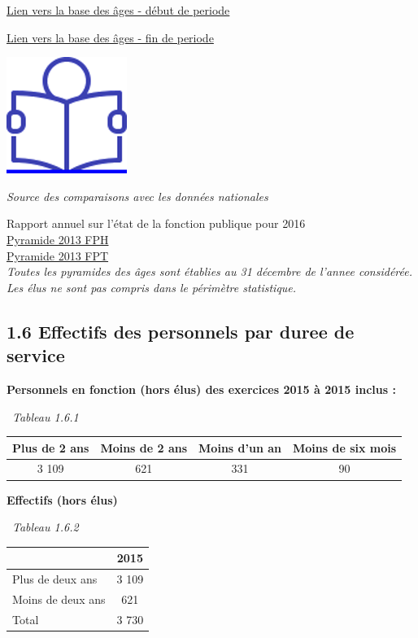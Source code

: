 \href{../Bases/Effectifs/Pyramide-des-ages-des-autres-personnels_2015.csv}{Lien
vers la base des âges - début de periode}

\href{../Bases/Effectifs/Pyramide-des-ages-des-autres-personnels_2015.csv}{Lien
vers la base des âges - fin de periode}

\href{../Docs/Notices/fiche_1.odt}{\includegraphics{icones/Notice.png}}

\emph{Source des comparaisons avec les données nationales}

Rapport annuel sur l'état de la fonction publique pour 2016\\
\href{../Docs/insee_pyramide_fph_2013.csv}{Pyramide 2013 FPH}\\
\href{../Docs/insee_pyramide_fpt_2013.csv}{Pyramide 2013 FPT}\\
\emph{Toutes les pyramides des âges sont établies au 31 décembre de
l'annee considérée.}\\
\emph{Les élus ne sont pas compris dans le périmètre statistique.}

\hypertarget{effectifs-des-personnels-par-duree-de-service}{%
\subsection{1.6 Effectifs des personnels par duree de
service}\label{effectifs-des-personnels-par-duree-de-service}}

\textbf{Personnels en fonction (hors élus) des exercices 2015 à 2015
inclus :}

~\emph{Tableau 1.6.1}

\begin{longtable}[]{@{}cccc@{}}
\toprule
Plus de 2 ans & Moins de 2 ans & Moins d'un an & Moins de six
mois\tabularnewline
\midrule
\endhead
3 109 & 621 & 331 & 90\tabularnewline
\bottomrule
\end{longtable}

\textbf{Effectifs (hors élus)}

~\emph{Tableau 1.6.2}

\begin{longtable}[]{@{}lc@{}}
\toprule
& 2015\tabularnewline
\midrule
\endhead
Plus de deux ans & 3 109\tabularnewline
Moins de deux ans & 621\tabularnewline
Total & 3 730\tabularnewline
\bottomrule
\end{longtable}

